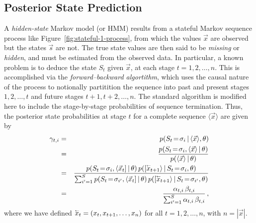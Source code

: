 \documentclass[a4paper]{article}
\newcommand{\rvec}[1]{\accentset{\leftarrow}{#1}}
\begin{document}
\subsection{Posterior State Prediction}

A {\em hidden-state} Markov model (or HMM) results from a stateful Markov sequence process like Figure~\ref{fig:stateful-1-process}, from which the values $\vec{x}$ are observed
but the states $\vec{s}$ are not. The true state values are then said to be {\em missing} or {\em hidden}, and must be estimated from the observed data.
In particular, a known problem is to deduce the state $S_t$ given $\vec{x}$, at each stage $t=1,2,\ldots,n$. This is accomplished
via the {\em forward--backward algortithm}, which uses the causal nature of the process to notionally partitition the sequence into past and present stages $1,2,\ldots,t$ and future stages $t+1,t+2,\ldots,n$.
The standard algorithm is modified here to include the stage-by-stage probabilities of sequence termination.
Thus, the posterior state probabilities at stage $t$ for a complete sequence $\langle\vec{x}\rangle$ are given by
\begin{eqnarray}
   \gamma_{t,i} & = & p(S_t\!=\!\sigma_i\,|\,\langle\vec{x}\rangle,\theta)
\nonumber\\& = &
   \frac{p(S_t\!=\!\sigma_i,\langle\vec{x}\rangle\,|\,\theta)}
        {p(\langle\vec{x}\rangle\,|\,\theta)}
\nonumber\\& = &
   \frac{p(S_t\!=\!\sigma_i,\langle\vec{x}_t]\,|\,\theta)\,p([\rvec{x}_{t+1}\rangle\,|\,S_t\!=\!\sigma_i,\theta)}
        {\sum_{i'=1}^{S}p(S_t\!=\!\sigma_{i'},\langle\vec{x}_t]\,|\,\theta)\,p([\rvec{x}_{t+1}\rangle\,|\,S_t\!=\!\sigma_{i'},\theta)}
\nonumber\\& = &
   \frac{\alpha_{t,i}\,\beta_{t,i}}
        {\sum_{i'=1}^{S}\alpha_{t,i}\,\beta_{t,i}}
\,,
\label{eq:gamma_t_i}
\end{eqnarray}
where we have defined $\rvec{x}_{t}=(x_t,x_{t+1},\ldots,x_n)$ for all $t=1,2,\ldots,n$, with $n=|\vec{x}|$.
\end{document}
